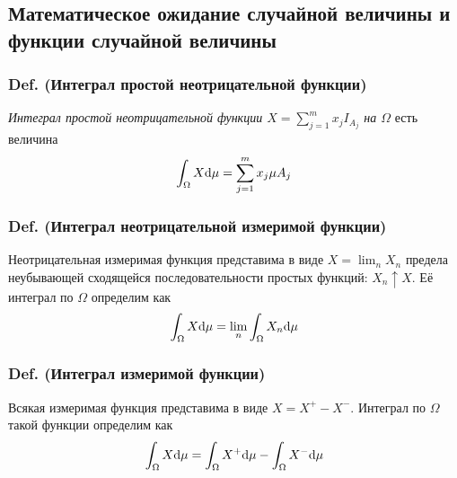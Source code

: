 \subsection{Математическое ожидание случайной величины и функции
случайной
величины}\label{ux43cux430ux442ux435ux43cux430ux442ux438ux447ux435ux441ux43aux43eux435-ux43eux436ux438ux434ux430ux43dux438ux435-ux441ux43bux443ux447ux430ux439ux43dux43eux439-ux432ux435ux43bux438ux447ux438ux43dux44b-ux438-ux444ux443ux43dux43aux446ux438ux438-ux441ux43bux443ux447ux430ux439ux43dux43eux439-ux432ux435ux43bux438ux447ux438ux43dux44b}

\subsubsection{Def. (Интеграл простой неотрицательной
функции)}\label{def.-ux438ux43dux442ux435ux433ux440ux430ux43b-ux43fux440ux43eux441ux442ux43eux439-ux43dux435ux43eux442ux440ux438ux446ux430ux442ux435ux43bux44cux43dux43eux439-ux444ux443ux43dux43aux446ux438ux438}

\emph{Интеграл простой неотрицательной функции
\(X = \sum_{j=1}^m x_j I_{A_j}\) на \(\Omega\)} есть величина
\[ \int_\Omega X\mathrm d\mu = \sum_{j=1}^m x_j \mu A_j\]

\subsubsection{Def. (Интеграл неотрицательной измеримой
функции)}\label{def.-ux438ux43dux442ux435ux433ux440ux430ux43b-ux43dux435ux43eux442ux440ux438ux446ux430ux442ux435ux43bux44cux43dux43eux439-ux438ux437ux43cux435ux440ux438ux43cux43eux439-ux444ux443ux43dux43aux446ux438ux438}

Неотрицательная измеримая функция представима в виде \(X = \lim_n X_n\)
предела неубывающей сходящейся последовательности простых функций:
\(X_n \uparrow X\). Её интеграл по \(\Omega\) определим как
\[ \int_\Omega X\mathrm d\mu = \lim_n \int_\Omega X_n \mathrm d\mu \]

\subsubsection{Def. (Интеграл измеримой
функции)}\label{def.-ux438ux43dux442ux435ux433ux440ux430ux43b-ux438ux437ux43cux435ux440ux438ux43cux43eux439-ux444ux443ux43dux43aux446ux438ux438}

Всякая измеримая функция представима в виде \(X = X^+ - X^-\). Интеграл
по \(\Omega\) такой функции определим как
\[ \int_\Omega X \mathrm d\mu = \int_\Omega X^+ \mathrm d\mu - \int_\Omega X^- \mathrm d\mu \]

